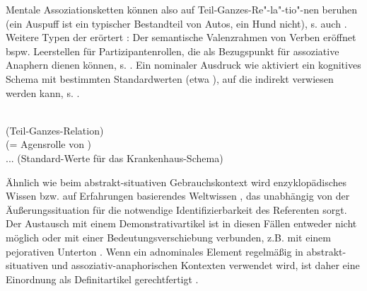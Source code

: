  \begin{exe}
	\ex \label{ex:asso2}   
	\begin{xlist}
		\ex \label{ex:auspuff}  
		\ex \label{ex:hund} 
		\end{xlist}
\end{exe}

Mentale Assoziationsketten können also auf Teil-Ganzes-Re"-la"-tio"-nen beruhen (ein Auspuff ist ein typischer Bestandteil von Autos, ein Hund nicht), s. auch . Weitere Typen der  erörtert \textcite[98-122]{Schwarz2000}: Der semantische Valenzrahmen von Verben eröffnet bspw. Leerstellen für Partizipantenrollen, die als Bezugspunkt für assoziative Anaphern dienen können, s. . Ein nominaler Ausdruck wie  aktiviert ein kognitives Schema mit bestimmten Standardwerten (etwa ), auf die indirekt verwiesen werden kann, s. . 

\begin{exe}
	\ex \label{ex:asso3}   
	\begin{xlist}
		\ex \label{ex:meronymie}  \\  (Teil-Ganzes-Relation)
		\ex \label{ex:rolle}  \\  (= Agensrolle von ) \object{fordern ein hohes Lösegeld.}
				\ex \label{ex:krank}  \\ ... (Standard-Werte für das Krankenhaus-Schema)
		\end{xlist}
\end{exe}

Ähnlich wie beim abstrakt-situativen Gebrauchskontext wird enzyklopädisches Wissen bzw. auf Erfahrungen basierendes Weltwissen , das unabhängig von der Äußerungssituation für die notwendige Identifizierbarkeit des Referenten sorgt. Der Austausch mit einem Demonstrativartikel ist in diesen Fällen entweder nicht möglich oder mit einer Bedeutungsverschiebung verbunden, z.B. mit einem pejorativen Unterton \parencite[989]{Hauenschild1993}. Wenn ein adnominales Element regelmäßig in abstrakt-situativen und assoziativ-anaphorischen Kontexten verwendet wird, ist daher eine Einordnung als Definitartikel gerechtfertigt \parencite[190]{Himmelmann1997}.


